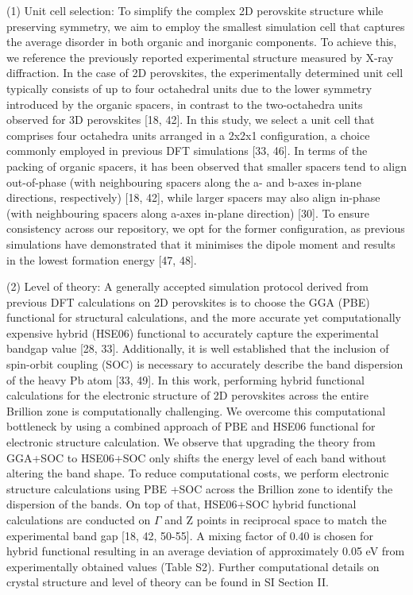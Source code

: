 (1) Unit cell selection: To simplify the complex 2D perovskite structure while preserving symmetry, we aim to employ the smallest simulation cell that captures the average disorder in both organic and inorganic components. To achieve this, we reference the previously reported experimental structure measured by X-ray diffraction. In the case of 2D perovskites, the experimentally determined unit cell typically consists of up to four octahedral units due to the lower symmetry introduced by the organic spacers, in contrast to the two-octahedra units observed for 3D perovskites [18, 42]. In this study, we select a unit cell that comprises four octahedra units arranged in a 2x2x1 configuration, a choice commonly employed in previous DFT simulations [33, 46]. In terms of the packing of organic spacers, it has been observed that smaller spacers tend to align out-of-phase (with neighbouring spacers along the a- and b-axes in-plane directions, respectively) [18, 42], while larger spacers may also align in-phase (with neighbouring spacers along a-axes in-plane direction) [30]. To ensure consistency across our repository, we opt for the former configuration, as previous simulations have demonstrated that it minimises the dipole moment and results in the lowest formation energy [47, 48].  

(2) Level of theory: A generally accepted simulation protocol derived from previous DFT calculations on 2D perovskites is to choose the GGA (PBE) functional for structural calculations, and the more accurate yet computationally expensive hybrid (HSE06) functional to accurately capture the experimental bandgap value [28, 33]. Additionally, it is well established that the inclusion of spin-orbit coupling (SOC) is necessary to accurately describe the band dispersion of the heavy Pb atom [33, 49]. In this work, performing hybrid functional calculations for the electronic structure of 2D perovskites across the entire Brillion zone is computationally challenging. We overcome this computational bottleneck by using a combined approach of PBE and HSE06 functional for electronic structure calculation. We observe that upgrading the theory from GGA+SOC to HSE06+SOC only shifts the energy level of each band without altering the band shape. To reduce computational costs, we perform electronic structure calculations using PBE +SOC across the Brillion zone to identify the dispersion of the bands. On top of that, HSE06+SOC hybrid functional calculations are conducted on $\Gamma$ and Z points in reciprocal space to match the experimental band gap [18, 42, 50-55]. A mixing factor of 0.40 is chosen for hybrid functional resulting in an average deviation of approximately 0.05 eV from experimentally obtained values (Table S2). Further computational details on crystal structure and level of theory can be found in SI Section II. 

